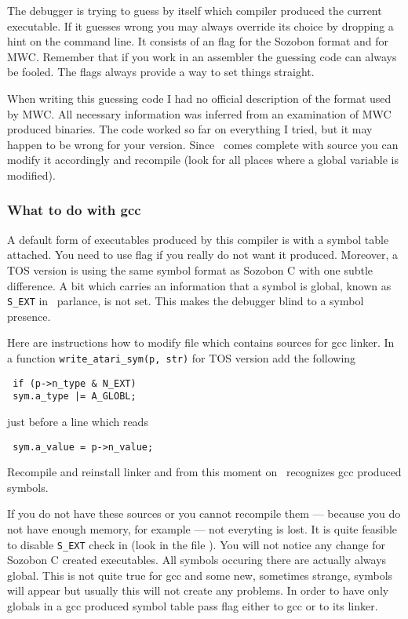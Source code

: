 The debugger is trying to guess by itself which compiler produced
the current executable.  If it guesses wrong you may always override
its choice by dropping a hint on the command line.
It consists of an  flag for the Sozobon format and  for MWC.
Remember that if you work in an assembler the guessing code can always
be fooled.  The flags always provide a way to set things straight.

When writing this guessing code I had no official description
of the format used by MWC.  All necessary information was inferred
from an examination of MWC produced binaries.
The code  worked so far on everything
I tried, but it may happen to be wrong for your version.
Since \szadb\ comes complete with source you can
modify it accordingly and recompile
(look for all places where a global variable  is modified).

\subsubsection{What to do with gcc}

A default form of executables produced by this compiler is with a symbol
table attached. You need to use  flag if you really do not want
it produced.  Moreover, a TOS version is using the same symbol format
as Sozobon C with one subtle difference.  A bit which carries an information
that a symbol is global, known as \verb|S_EXT| in \szadb\ parlance,
is not set.  This makes the debugger blind to a symbol presence.

Here are instructions how to modify file  which contains sources
for gcc linker. In a function \verb|write_atari_sym(p, str)| for TOS version
add the following
\begin{exmpl}
	\verb? if (p->n_type & N_EXT)?\\
	\makebox[1.5cm]{}\verb? sym.a_type |= A_GLOBL;?
\end{exmpl}
just before a line which reads
\begin{exmpl}
	\verb? sym.a_value = p->n_value;?
\end{exmpl}
Recompile and reinstall linker and from this moment on \szadb\
recognizes gcc produced symbols.

If you do not have these sources or you cannot recompile them ---
because you do not have enough memory, for example --- not everyting is
lost.  It is quite feasible to disable \verb|S_EXT| check in 
(look in the file \name{adb1.c}).  
You will not notice any change for Sozobon C created executables.
All symbols occuring there are actually always global.
This is not quite true for gcc and some new, sometimes strange, symbols
will appear but usually this will not create any problems.
In order to have only globals in a gcc produced symbol table
pass  flag either to gcc or to its linker.

